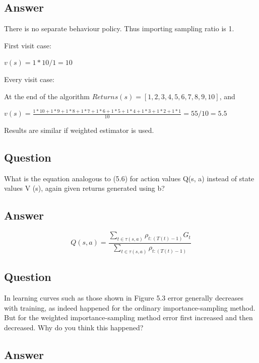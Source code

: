 \documentclass[11pt]{article}
\begin{document}
    \subsection*{Answer}

    There is no separate behaviour policy.
    Thus importing sampling ratio is 1.

    First visit case:

    $ v(s) = 1 * 10 / 1 =  10 $

    Every visit case:

    At the end of the algorithm $Returns(s)=[1,2,3,4,5,6,7,8,9,10] $, and

    $ v(s) = \frac{ 1 * 10 + 1 * 9 + 1 * 8 + 1 * 7 + 1 * 6 + 1 * 5 + 1* 4 + 1 * 3 + 1 * 2 + 1 * 1 }{10} =  55 / 10 = 5.5 $

    Results are similar if weighted estimator is used.

    \subsection{Question}

    What is the equation analogous to (5.6) for action values Q(s, a) instead of state values V (s), again given returns generated using b?


    \subsection*{Answer}

    \begin{equation}
        Q(s,a) = \frac{\sum_{t \in \tau (s,a) } \rho_{t:(T(t)-1)} G_{t} }{ \sum_{t \in \tau (s,a) } \rho_{t:(T(t)-1)} }
    \end{equation}

    \subsection{Question}

    In learning curves such as those shown in Figure 5.3 error generally decreases with training, as indeed happened for the ordinary importance-sampling method.
    But for the weighted importance-sampling method error first increased and then decreased.
    Why do you think this happened?

    \subsection*{Answer}
\end{document}
